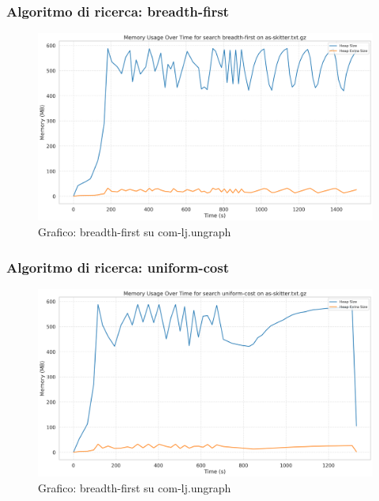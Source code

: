 \documentclass{article}
\begin{document}
\subsubsection{Algoritmo di ricerca: breadth-first}
\begin{figure}[htbp]\centering
\includegraphics[width=\textwidth]{../plots/as-skitter_breadth-first.png}
\caption{Grafico: breadth-first su com-lj.ungraph}
\end{figure}
\subsubsection{Algoritmo di ricerca: uniform-cost}
\begin{figure}[htbp]\centering
\includegraphics[width=\textwidth]{../plots/as-skitter_uniform-cost.png}
\caption{Grafico: breadth-first su com-lj.ungraph}
\end{figure}
\end{document}
